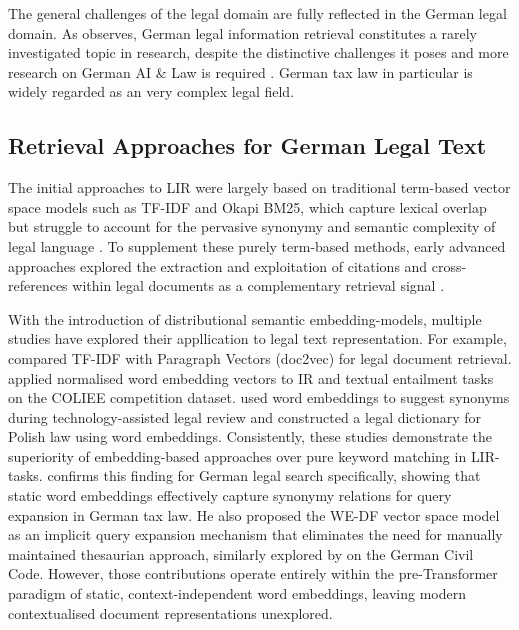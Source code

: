 The general challenges of the legal domain are fully reflected in the German legal domain. As \citet{landthaler_improving_2019} observes, German legal information retrieval constitutes a rarely investigated topic in research, despite the distinctive challenges it poses and more research on German \ac{AI} \& Law is required \cite{waltl2018semantic}. German tax law in particular is widely regarded as an very complex legal field. %

\subsection{Retrieval Approaches for German Legal Text}

The initial approaches to \ac{LIR} were largely based on traditional term-based vector space models such as \ac{TF-IDF} and Okapi BM25, which capture lexical overlap but struggle to account for the pervasive synonymy and semantic complexity of legal language \cite{wiggers2018exploration}. To supplement these purely term-based methods, early advanced approaches explored the extraction and exploitation of citations and cross-references within legal documents as a complementary retrieval signal \cite{Waltl2016_Differentiation,landthaler_improving_2019}.

With the introduction of distributional semantic embedding-models, multiple studies have explored their appllication to legal text representation. For example, \citet{sugathadasa2019legal} compared \ac{TF-IDF} with Paragraph Vectors (doc2vec) for legal document retrieval. \citet{adebayo2016textual} applied normalised word embedding vectors to \ac{IR} and textual entailment tasks on the COLIEE competition dataset. \citet{vo2017experimenting} used word embeddings to suggest synonyms during technology-assisted legal review and \citet{swyminski2019automatic} constructed a legal dictionary for Polish law using word embeddings. Consistently, these studies demonstrate the superiority of embedding-based approaches over pure keyword matching in \ac{LIR}-tasks. \citet{landthaler_improving_2019} confirms this finding for German legal search specifically, showing that static word embeddings effectively capture synonymy relations for query expansion in German tax law. He also proposed the WE-DF vector space model as an implicit query expansion mechanism that eliminates the need for manually maintained thesaurian approach, similarly explored by \citet{pickel2016prototypical} on the German Civil Code. However, those contributions operate entirely within the pre-Transformer paradigm of static, context-independent word embeddings, leaving modern contextualised document representations unexplored.

